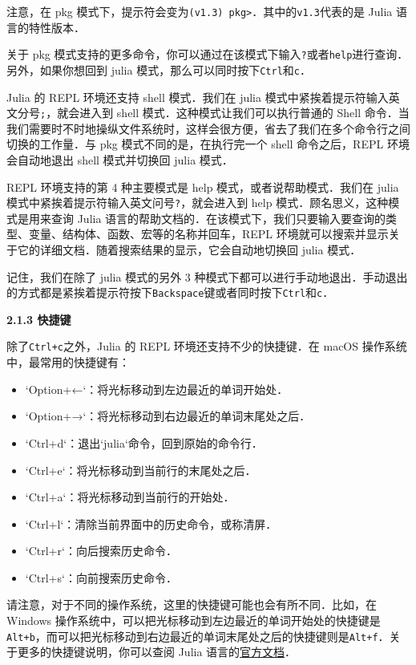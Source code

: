 注意，在 pkg 模式下，提示符会变为\verb|(v1.3) pkg>|．其中的\verb|v1.3|代表的是 Julia 语言的特性版本．

关于 pkg 模式支持的更多命令，你可以通过在该模式下输入\verb|?|或者\verb|help|进行查询．另外，如果你想回到 julia 模式，那么可以同时按下\verb|Ctrl|和\verb|c|．

Julia 的 REPL 环境还支持 shell 模式．我们在 julia 模式中紧挨着提示符输入英文分号\verb|;|，就会进入到 shell 模式．这种模式让我们可以执行普通的 Shell 命令．当我们需要时不时地操纵文件系统时，这样会很方便，省去了我们在多个命令行之间切换的工作量．与 pkg 模式不同的是，在执行完一个 shell 命令之后，REPL 环境会自动地退出 shell 模式并切换回 julia 模式．

REPL 环境支持的第 4 种主要模式是 help 模式，或者说帮助模式．我们在 julia 模式中紧挨着提示符输入英文问号\verb|?|，就会进入到 help 模式．顾名思义，这种模式是用来查询 Julia 语言的帮助文档的．在该模式下，我们只要输入要查询的类型、变量、结构体、函数、宏等的名称并回车，REPL 环境就可以搜索并显示关于它的详细文档．随着搜索结果的显示，它会自动地切换回 julia 模式．

记住，我们在除了 julia 模式的另外 3 种模式下都可以进行手动地退出．手动退出的方式都是紧挨着提示符按下\verb|Backspace|键或者同时按下\verb|Ctrl|和\verb|c|．

\textbf{2.1.3 快捷键}

除了\verb|Ctrl+c|之外，Julia 的 REPL 环境还支持不少的快捷键．在 macOS 操作系统中，最常用的快捷键有：

\begin{itemize}
\item `Option+←`：将光标移动到左边最近的单词开始处．
\item  `Option+→`：将光标移动到右边最近的单词末尾处之后．
\item  `Ctrl+d`：退出`julia`命令，回到原始的命令行．
\item  `Ctrl+e`：将光标移动到当前行的末尾处之后．
\item  `Ctrl+a`：将光标移动到当前行的开始处．
\item  `Ctrl+l`：清除当前界面中的历史命令，或称清屏．
\item  `Ctrl+r`：向后搜索历史命令．
\item  `Ctrl+s`：向前搜索历史命令．
\end{itemize}

请注意，对于不同的操作系统，这里的快捷键可能也会有所不同．比如，在 Windows 操作系统中，可以把光标移动到左边最近的单词开始处的快捷键是\verb|Alt+b|，而可以把光标移动到右边最近的单词末尾处之后的快捷键则是\verb|Alt+f|．关于更多的快捷键说明，你可以查阅 Julia 语言的\href{https://docs.julialang.org/en/v1/stdlib/REPL/#Key-bindings-1}{官方文档}．

